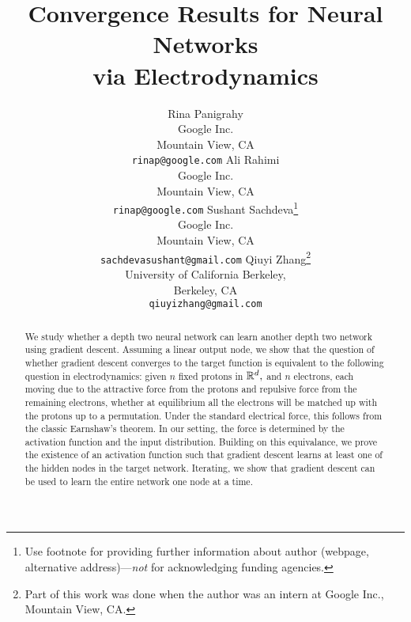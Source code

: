 \documentclass{article}
\title{
Convergence Results for Neural Networks
\\ via Electrodynamics
}
\author{
Rina Panigrahy \\
Google Inc. \\
Mountain View, CA\\
\texttt{rinap@google.com}
Ali Rahimi \\
Google Inc. \\
Mountain View, CA\\
\texttt{rinap@google.com}
\And
 Sushant Sachdeva\thanks{Use footnote for providing further
    information about author (webpage, alternative
    address)---\emph{not} for acknowledging funding agencies.}  \\
Google Inc. \\
Mountain View, CA \\
\texttt{sachdevasushant@gmail.com}  
\And
Qiuyi Zhang\thanks{Part of this work was done when the author was
an intern at Google Inc., Mountain View, CA.}  \\
University of California Berkeley, \\
Berkeley, CA \\
\texttt{qiuyizhang@gmail.com}
}
\begin{document}
 
\maketitle

\begin{abstract} 
We study whether a depth two neural network can learn another 
depth two network using gradient descent.
Assuming a linear output node,
we show that
the question of whether gradient descent converges to the 
target function is equivalent to the following question in
electrodynamics: 
given $n$ fixed protons in $\mathbb R^d,$ and $n$ electrons,
each moving due to the attractive force from the protons and repulsive
force from the remaining electrons,
whether at equilibrium all the electrons will be matched up with 
the protons up to a permutation. 
Under the standard electrical
force, this follows from the classic Earnshaw's theorem. In our setting,
the force  is 
determined by the activation function and the
input distribution.  
Building on this equivalance, we prove the
existence of an activation function such that 
gradient descent learns
at least one of the
hidden nodes in the target network. 
Iterating, we show that gradient
descent can be used to learn the entire network one node at a time.
\end{abstract} 








\end{document}
